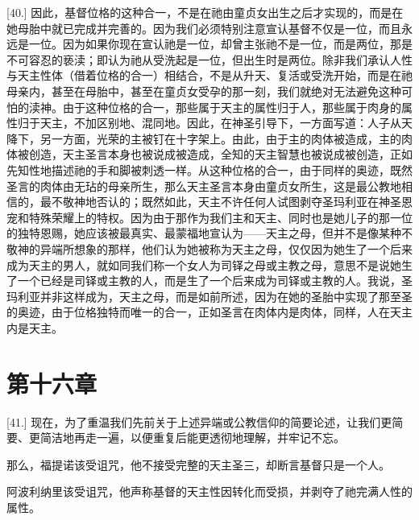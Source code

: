 [40.] 因此，基督位格的这种合一，不是在祂由童贞女出生之后才实现的，而是在她母胎中就已完成并完善的。因为我们必须特别注意宣认基督不仅是一位，而且永远是一位。因为如果你现在宣认祂是一位，却曾主张祂不是一位，而是两位，那是不可容忍的亵渎；即认为祂从受洗起是一位，但出生时是两位。除非我们承认人性与天主性体（借着位格的合一）相结合，不是从升天、复活或受洗开始，而是在祂母亲内，甚至在母胎中，甚至在童贞女受孕的那一刻，我们就绝对无法避免这种可怕的渎神。由于这种位格的合一，那些属于天主的属性归于人，那些属于肉身的属性归于天主，不加区别地、混同地。因此，在神圣引导下，一方面写道：人子从天降下，另一方面，光荣的主被钉在十字架上。由此，由于主的肉体被造成，主的肉体被创造，天主圣言本身也被说成被造成，全知的天主智慧也被说成被创造，正如先知性地描述祂的手和脚被刺透一样。从这种位格的合一，由于同样的奥迹，既然圣言的肉体由无玷的母亲所生，那么天主圣言本身由童贞女所生，这是最公教地相信的，最不敬神地否认的；既然如此，天主不许任何人试图剥夺圣玛利亚在神圣恩宠和特殊荣耀上的特权。因为由于那作为我们主和天主、同时也是她儿子的那一位的独特恩赐，她应该被最真实、最蒙福地宣认为——天主之母，但并不是像某种不敬神的异端所想象的那样，他们认为她被称为天主之母，仅仅因为她生了一个后来成为天主的男人，就如同我们称一个女人为司铎之母或主教之母，意思不是说她生了一个已经是司铎或主教的人，而是生了一个后来成为司铎或主教的人。我说，圣玛利亚并非这样成为，天主之母，而是如前所述，因为在她的圣胎中实现了那至圣的奥迹，由于位格独特而唯一的合一，正如圣言在肉体内是肉体，同样，人在天主内是天主。\par


\section{第十六章}

\par

[41.] 现在，为了重温我们先前关于上述异端或公教信仰的简要论述，让我们更简要、更简洁地再走一遍，以便重复后能更透彻地理解，并牢记不忘。\par

那么，福提诺该受诅咒，他不接受完整的天主圣三，却断言基督只是一个人。\par

阿波利纳里该受诅咒，他声称基督的天主性因转化而受损，并剥夺了祂完满人性的属性。\par

